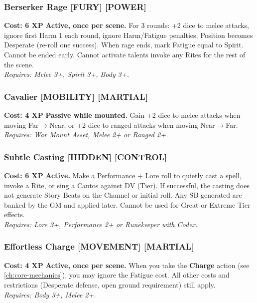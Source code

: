 \subsubsection*{Berserker Rage \textnormal{[FURY] [POWER]}}
\label{talent:berserker-rage}
\textbf{Cost: 6 XP} \textbf{Active, once per scene.} For 3 rounds: +2 dice to melee attacks, ignore first Harm 1 each round, ignore Harm/Fatigue penalties, Position becomes Desperate (re-roll one success). When rage ends, mark Fatigue equal to Spirit. Cannot be ended early. Cannot activate talents invoke any Rites for the rest of the scene. \\
\textit{Requires: Melee 3+, Spirit 3+, Body 3+.}

\subsubsection*{Cavalier \textnormal{[MOBILITY] [MARTIAL]}}
\label{talent:cavalier}
\textbf{Cost: 4 XP} \textbf{Passive while mounted.} Gain +2 dice to melee attacks when moving Far$\rightarrow$Near, or +2 dice to ranged attacks when moving Near$\rightarrow$Far. \\
\textit{Requires: War Mount Asset, Melee 2+ or Ranged 2+.}

\subsubsection*{Subtle Casting \textnormal{[HIDDEN] [CONTROL]}}
\label{talent:subtle-casting}
\textbf{Cost: 6 XP} \textbf{Active.} Make a Performance + Lore roll to quietly cast a spell, invoke a Rite, or sing a Cantos against DV (Tier). If successful, the casting does not generate Story Beats on the Channel or initial roll. Any SB generated are banked by the GM and applied later. Cannot be used for Great or Extreme Tier effects. \\
\textit{Requires: Lore 3+, Performance 2+ or Runekeeper with Codex.}

\subsubsection*{Effortless Charge \textnormal{[MOVEMENT] [MARTIAL]}}
\label{talent:effortless-charge}
\textbf{Cost: 4 XP} \textbf{Active, once per scene.} When you take the \textbf{Charge} action (see \ref{ch:core-mechanics}), you may ignore the Fatigue cost. All other costs and restrictions (Desperate defense, open ground requirement) still apply. \\
\textit{Requires: Body 3+, Melee 2+.}

